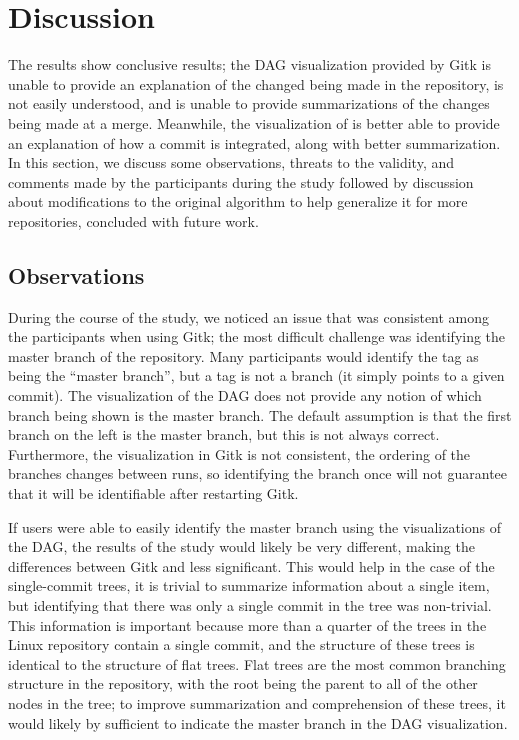 
\section{Discussion}
\label{sec:discussion}

The results show conclusive results; the DAG visualization provided by
Gitk is unable to provide an explanation of the changed being made in
the repository, is not easily understood, and is unable to provide
summarizations of the changes being made at a merge. Meanwhile, the \mt
visualization of \tool is better able to provide an explanation of how a
commit is integrated, along with better summarization. In this section,
we discuss some observations, threats to the validity, and comments made
by the participants during the study followed by discussion about
modifications to the original algorithm to help generalize it for more
repositories, concluded with future work.


\subsection{Observations}
\label{sub:observations}

During the course of the study, we noticed an issue that was consistent
among the participants when using Gitk; the most difficult challenge was
identifying the master branch of the repository. Many participants would
identify the tag as being the ``master branch'', but a tag is not a
branch (it simply points to a given commit). The visualization of the DAG does not provide any notion of
which branch being shown is the master branch. The default assumption is
that the first branch on the left is the master branch, but this is not
always correct. Furthermore, the visualization in Gitk is not
consistent, the ordering of the branches changes between runs, so
identifying the branch once will not guarantee that it will be
identifiable after restarting Gitk.


If users were able to easily identify the master branch using the
visualizations of the DAG, the results of the study would likely be very
different, making the differences between Gitk and \tool less
significant. This would help in the case of the single-commit trees, it
is trivial to summarize information about a single item, but identifying
that there was only a single commit in the tree was non-trivial. This
information is important because more than a quarter of the trees in the
Linux repository contain a single commit, and the structure of these
trees is identical to the structure of flat trees. Flat trees are the
most common branching structure in the repository, with the root being
the parent to all of the other nodes in the tree; to improve
summarization and comprehension of these trees, it would likely by
sufficient to indicate the master branch in the DAG visualization.

